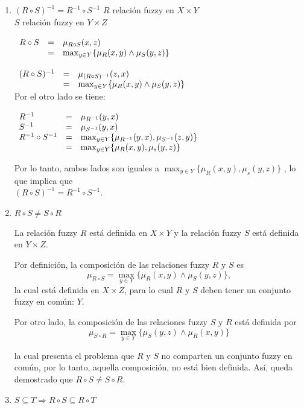 \documentclass[letterpaper,spanish,11pt]{article}
\begin{document}
\begin{enumerate}
\item $(R\circ S)^{-1} = R^{-1}\circ S^{-1}$
$R$ relaci\'{o}n fuzzy en $X\times Y$\\
$S$ relaci\'{o}n fuzzy en $Y\times Z$\\


$\begin{array}{l l l }\\
R \circ S &= &\mu_{ R \circ S}(x,z)\\
 &= & \max_{y\in Y} \{\mu_{R}(x,y) \wedge \mu_{S}(y,z) \}\\
\end{array}$\\

$\begin{array}{l l l }\\
(R\circ S)^{-1} &= &\mu_{(R\circ S)^{-1}}(z,x)\\
 &= & \max_{y\in Y} \{\mu_{R}(x,y) \wedge \mu_{S}(y,z) \}\\
\end{array}$\\

Por el otro lado se tiene:\\
$\begin{array}{l l l}\\
R^{-1} &= &\mu_{R^{-1}}(y,x)\\
S^{-1} &= &\mu_{S^{-1}}(y,x)\\
R^{-1} \circ S^{-1}  &= &\max_{y\in Y}\{\mu_{R^{-1}}(y,x),\mu_{S^{-1}}(z,y)\}\\
 &= & \max_{y\in  Y}\{\mu_{R}(x,y),\mu_{s}(y,z)\}
\end{array}$

Por lo tanto, ambos lados son iguales a $\max_{y\in  Y}\{\mu_{R}(x,y),\mu_{s}(y,z)\}$ , lo
que implica que\\ $(R\circ S)^{-1} = R^{-1}\circ S^{-1}$.

\item $R \circ S  \neq S \circ R$

La relaci\'{o}n fuzzy $R$ est\'{a} definida en $X\times Y$ y la relaci\'{o}n fuzzy $S$
est\'{a} definida en $Y\times Z$.

Por definici\'{o}n, la composici\'{o}n de las relaciones fuzzy $R$ y $S$ es $$\mu_{R\circ S} = \max_{y \in
Y}\{\mu_{R}(x,y) \wedge \mu_{S}(y,z) \},$$ la cual est\'{a} definida en $X\times Z$, para lo
cual $R$ y $S$ deben tener un conjunto fuzzy en com\'{u}n: $Y$.

Por otro lado, la composici\'{o}n de las relaciones fuzzy $S$ y $R$ est\'{a} definida por
$$\mu_{S\circ R} = \max_{y \in Y}\{\mu_{S}(y,z) \wedge \mu_{R}(x,y) \}$$

la cual presenta el problema que $R$ y $S$ no comparten un conjunto fuzzy en
com\'{u}n, por lo tanto, aquella composici\'{o}n, no est\'{a} bien definida.
As\'{i}, queda demostrado que $R \circ S  \neq S \circ R$.

\item $S \subseteq T \Rightarrow R \circ S  \subseteq R \circ T$

\end{enumerate}



\end{document}
